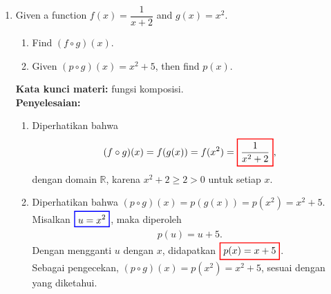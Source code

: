 \documentclass[10pt,openany,a4paper]{article}
\theoremstyle{definition}
\theoremstyle{definition}
\theoremstyle{plain}
\newenvironment{jawab}[2][tes]{%
\par\noindent\textbf{Kata kunci materi:} #1.\\
\textbf{Penyelesaian:} #2%
}{}
\begin{document}
\begin{enumerate}
    \item Given a function $f(x)=\dfrac{1}{x+2}$ and $g(x)=x^2$.
    \begin{enumerate}
        \item Find $(f\circ g)(x)$.
        \item Given $(p\circ g)(x)=x^2+5$, then find $p(x)$.
    \end{enumerate}
    \begin{jawab}[fungsi komposisi]{
        \begin{enumerate}
            \item Diperhatikan bahwa
            \begin{align*}
                (f\circ g)(x) = f(g(x)) = f(x^2) = \colorlet{oldcolor}{.}
        \color{red}
        \setlength{\fboxrule}{1pt} \boxed{\color{oldcolor}\frac{1}{x^2+2}}\color{oldcolor},
            \end{align*}
            dengan domain $\mathbb{R}$, karena $x^2+2\geq 2>0$ untuk setiap $x$.
            \item Diperhatikan bahwa $(p\circ g)(x) = p(g(x)) = p(x^2) = x^2+5$. Misalkan $\colorlet{oldcolor}{.}
        \color{blue}
        \setlength{\fboxrule}{1pt} \boxed{\color{oldcolor}u = x^2}\color{oldcolor}$, maka diperoleh
            \begin{align*}
                p(u) = u + 5.
            \end{align*}
            Dengan mengganti $u$ dengan $x$, didapatkan $\colorlet{oldcolor}{.}
        \color{red}
        \setlength{\fboxrule}{1pt} \boxed{\color{oldcolor}p(x) = x + 5}\color{oldcolor}$.\\
            Sebagai pengecekan, $(p\circ g)(x) = p(x^2) = x^2 + 5$, sesuai dengan yang diketahui.
        \end{enumerate}
    }
    \end{jawab}
\end{enumerate}

\newpage
\end{document}
